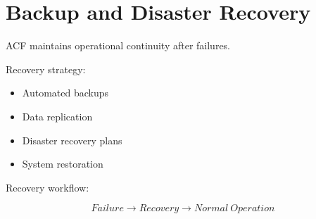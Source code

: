 \section{Backup and Disaster Recovery}


ACF maintains operational continuity after failures.



Recovery strategy:


\begin{itemize}

\item Automated backups

\item Data replication

\item Disaster recovery plans

\item System restoration

\end{itemize}



Recovery workflow:


\[
Failure
\rightarrow
Recovery
\rightarrow
Normal\ Operation
\]
